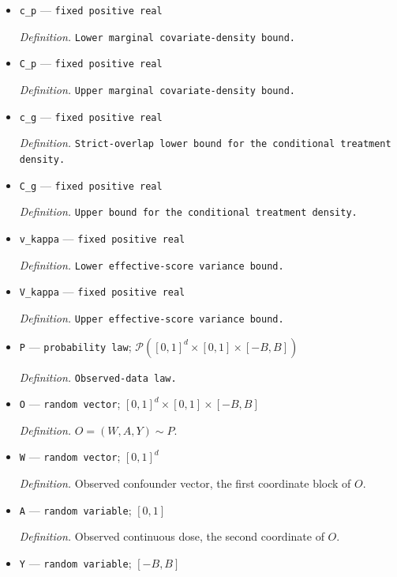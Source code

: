 \documentclass{article}
\begin{document}
\begin{itemize}
  \item \texttt{c\_\allowbreak{}p} --- \texttt{fixed positive real}
  \par\smallskip\noindent\emph{Definition.} \texttt{Lower marginal covariate-\allowbreak{}density bound.}
  \item \texttt{C\_\allowbreak{}p} --- \texttt{fixed positive real}
  \par\smallskip\noindent\emph{Definition.} \texttt{Upper marginal covariate-\allowbreak{}density bound.}
  \item \texttt{c\_\allowbreak{}g} --- \texttt{fixed positive real}
  \par\smallskip\noindent\emph{Definition.} \texttt{Strict-\allowbreak{}overlap lower bound for the conditional treatment density.}
  \item \texttt{C\_\allowbreak{}g} --- \texttt{fixed positive real}
  \par\smallskip\noindent\emph{Definition.} \texttt{Upper bound for the conditional treatment density.}
  \item \texttt{v\_\allowbreak{}kappa} --- \texttt{fixed positive real}
  \par\smallskip\noindent\emph{Definition.} \texttt{Lower effective-\allowbreak{}score variance bound.}
  \item \texttt{V\_\allowbreak{}kappa} --- \texttt{fixed positive real}
  \par\smallskip\noindent\emph{Definition.} \texttt{Upper effective-\allowbreak{}score variance bound.}
  \item \texttt{P} --- \texttt{probability law}; \(\mathcal P([0,1]^{d}\times[0,1]\times[-B,B])\)
  \par\smallskip\noindent\emph{Definition.} \texttt{Observed-\allowbreak{}data law.}
  \item \texttt{O} --- \texttt{random vector}; \([0,1]^{d}\times[0,1]\times[-B,B]\)
  \par\smallskip\noindent\emph{Definition.} \(O=(W,A,Y)\sim P\).
  \item \texttt{W} --- \texttt{random vector}; \([0,1]^{d}\)
  \par\smallskip\noindent\emph{Definition.} Observed confounder vector, the first coordinate block of \(O\).
  \item \texttt{A} --- \texttt{random variable}; \([0,1]\)
  \par\smallskip\noindent\emph{Definition.} Observed continuous dose, the second coordinate of \(O\).
  \item \texttt{Y} --- \texttt{random variable}; \([-B,B]\)

\end{itemize}
\end{document}
